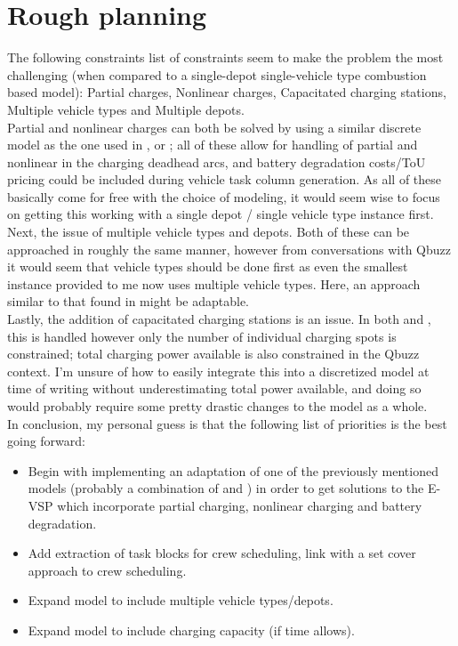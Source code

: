 \documentclass[]{article}
\begin{document}
\section{Rough planning}
The following constraints list of constraints seem to make the problem the most challenging (when compared to a single-depot single-vehicle type combustion based model): Partial charges, Nonlinear charges, Capacitated charging stations, Multiple vehicle types and Multiple depots. \\
Partial and nonlinear charges can both be solved by using a similar discrete model as the one used in , \citet{Zhang2021} or ; all of these allow for handling of partial and nonlinear in the charging deadhead arcs, and battery degradation costs/ToU pricing could be included during vehicle task column generation. As all of these basically come for free with the choice of modeling, it would seem wise to focus on getting this working with a single depot / single vehicle type instance first. \\
Next, the issue of multiple vehicle types and depots. Both of these can be approached in roughly the same manner, however from conversations with Qbuzz it would seem that vehicle types should be done first as even the smallest instance provided to me now uses multiple vehicle types. Here, an approach similar to that found in \citet{Huisman2005} might be adaptable. \\
Lastly, the addition of capacitated charging stations is an issue. In both \citet{Zhang2021} and , this is handled however only the number of individual charging spots is constrained; total charging power available is also constrained in the Qbuzz context. I'm unsure of how to easily integrate this into a discretized model at time of writing without underestimating total power available, and doing so would probably require some pretty drastic changes to the model as a whole. \\
In conclusion, my personal guess is that the following list of priorities is the best going forward:
\begin{itemize}
  \item Begin with implementing an adaptation of one of the previously mentioned models (probably a combination of  and ) in order to get solutions to the E-VSP which incorporate partial charging, nonlinear charging and battery degradation.
  \item Add extraction of task blocks for crew scheduling, link with a set cover approach to crew scheduling.
  \item Expand model to include multiple vehicle types/depots.
  \item Expand model to include charging capacity (if time allows).
\end{itemize}
\end{document}

